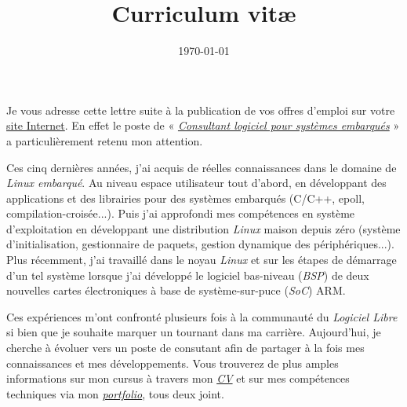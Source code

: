 \documentclass[11pt,a4paper,sans]{moderncv}
\title{Curriculum vit\ae}
\date{\today}
\begin{document}
\makelettertitle

Je vous adresse cette lettre suite à la publication de vos offres d'emploi sur votre \href{https://carrieres.savoirfairelinux.com/}{site Internet}. En effet le poste de « \href{https://carrieres.savoirfairelinux.com/#consultant-logiciel-pour-systemes-embarques}{\textit{Consultant logiciel pour systèmes embarqués}} » a particulièrement retenu mon attention.

Ces cinq dernières années, j'ai acquis de réelles connaissances dans le domaine de \textit{Linux embarqué}. Au niveau espace utilisateur tout d'abord, en développant des applications et des librairies pour des systèmes embarqués (C/C++, epoll, compilation-croisée...). Puis j'ai approfondi mes compétences en système d'exploitation en développant une distribution \textit{Linux} maison depuis zéro (système d'initialisation, gestionnaire de paquets, gestion dynamique des périphériques...). Plus récemment, j'ai travaillé dans le noyau \textit{Linux} et sur les étapes de démarrage d'un tel système lorsque j'ai développé le logiciel bas-niveau (\textit{BSP}) de deux nouvelles cartes électroniques à base de système-sur-puce (\textit{SoC}) ARM.

Ces expériences m'ont confronté plusieurs fois à la communauté du \textit{Logiciel Libre} si bien que je souhaite marquer un tournant dans ma carrière. Aujourd'hui, je cherche à évoluer vers un poste de consutant afin de partager à la fois mes connaissances et mes développements. Vous trouverez de plus amples informations sur mon cursus à travers mon \href{http://portay.fr/journees-quebec/pdf/french.pdf}{\textit{CV}} et sur mes compétences techniques via mon \href{http://portay.fr/journees-quebec/pdf/portfolio-french.pdf}{\textit{portfolio}}, tous deux joint.

\makeletterclosing
\end{document}
